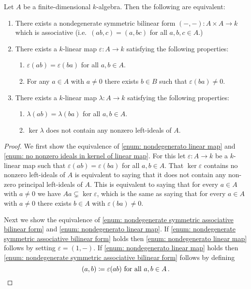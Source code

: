 \begin{proposition}
  Let $A$ be a finite-dimensional $k$-algebra.
  Then the following are equivalent:
  \begin{enumerate}[label=\emph{\roman*)},leftmargin=*]
    \item \label{enum: nondegenerate symmetric associative bilinear form}
      There exists a nondegenerate symmetric bilinear form $(-,-) \colon A \times A \to k$ which is associative (i.e.\ $(ab,c) = (a,bc)$ for all $a,b,c \in A$.)
    \item \label{enum: nondegenerato linear map}
      There exists a $k$-linear map $\varepsilon \colon A \to k$ satisfying the following properties:
      \begin{enumerate}[label=\emph{(\roman*)},leftmargin=*]
        \item
          $\varepsilon(ab) = \varepsilon(ba)$ for all $a,b \in A$.
        \item
          For any $a \in A$ with $a \neq 0$ there exists $b \in B$ such that $\varepsilon(ba) \neq 0$.
      \end{enumerate}
    \item \label{enum: no nonzero ideals in kernel of linear map}
      There exists a $k$-linear map $\lambda \colon A \to k$ satisfying the following properties:
      \begin{enumerate}[label=\emph{(\roman*)},leftmargin=*]
        \item
          $\lambda(ab) = \lambda(ba)$ for all $a,b \in A$.
        \item
          $\ker \lambda$ does not contain any nonzero left-ideals of $A$.
      \end{enumerate}
  \end{enumerate}
\end{proposition}
\begin{proof}
  We first show the equivalence of \ref{enum: nondegenerato linear map} and \ref{enum: no nonzero ideals in kernel of linear map}.
  For this let $\varepsilon \colon A \to k$ be a $k$-linear map such that $\varepsilon(ab) = \varepsilon(ba)$ for all $a,b \in A$.
  That $\ker \varepsilon$ contains no nonzero left-ideals of $A$ is equivalent to saying that it does not contain any non-zero principal left-ideals of $A$.
  This is equivalent to saying that for every $a \in A$ with $a \neq 0$ we have $Aa \subsetneq \ker \varepsilon$, which is the same as saying that for every $a \in A$ with $a \neq 0$ there exists $b \in A$ with $\varepsilon(ba) \neq 0$.
  
  Next we show the equivalence of \ref{enum: nondegenerate symmetric associative bilinear form} and \ref{enum: nondegenerato linear map}.
  If \ref{enum: nondegenerate symmetric associative bilinear form} holds then \ref{enum: nondegenerato linear map} follows by setting $\varepsilon = (1,-)$.
  If \ref{enum: nondegenerato linear map} holds then \ref{enum: nondegenerate symmetric associative bilinear form} follows by defining
  \[
              (a,b)
    \coloneqq \varepsilon(ab)
    \text{ for all }
    a, b \in A \,.
    \qedhere
  \]
\end{proof}


